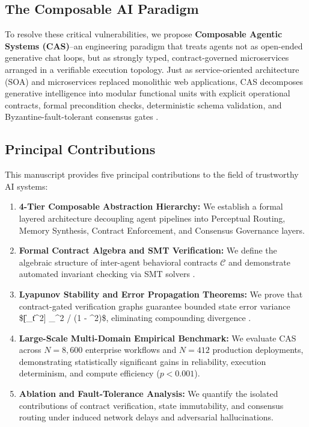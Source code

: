 \documentclass[10pt,twocolumn,letterpaper]{article}
\begin{document}
\subsection{The Composable AI Paradigm}


To resolve these critical vulnerabilities, we propose \textbf{Composable Agentic Systems (CAS)}--an engineering paradigm that treats agents not as open-ended generative chat loops, but as strongly typed, contract-governed microservices arranged in a verifiable execution topology. Just as service-oriented architecture (SOA) and microservices replaced monolithic web applications, CAS decomposes generative intelligence into modular functional units with explicit operational contracts, formal precondition checks, deterministic schema validation, and Byzantine-fault-tolerant consensus gates \cite{crossref_10_1109_access_2026_3656309,crossref_10_1145_3689096_3689462}.


\subsection{Principal Contributions}


This manuscript provides five principal contributions to the field of trustworthy AI systems:
\begin{enumerate}
  \item \textbf{4-Tier Composable Abstraction Hierarchy:} We establish a formal layered architecture decoupling agent pipelines into Perceptual Routing, Memory Synthesis, Contract Enforcement, and Consensus Governance layers.
  \item \textbf{Formal Contract Algebra and SMT Verification:} We define the algebraic structure of inter-agent behavioral contracts $\mathcal{C}$ and demonstrate automated invariant checking via SMT solvers \cite{arxiv_2404_01131}.
  \item \textbf{Lyapunov Stability and Error Propagation Theorems:} We prove that contract-gated verification graphs guarantee bounded state error variance \$[\|\_t\|^2] \le \sigma\_{\max}^2 / (1 - \rho^2)\$, eliminating compounding divergence \cite{arxiv_2501_02497}.
  \item \textbf{Large-Scale Multi-Domain Empirical Benchmark:} We evaluate CAS across $N = 8,600$ enterprise workflows and $N = 412$ production deployments, demonstrating statistically significant gains in reliability, execution determinism, and compute efficiency ($p < 0.001$).
  \item \textbf{Ablation and Fault-Tolerance Analysis:} We quantify the isolated contributions of contract verification, state immutability, and consensus routing under induced network delays and adversarial hallucinations.
\end{enumerate}
\end{document}
